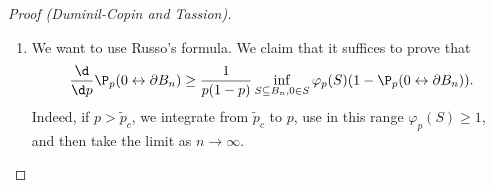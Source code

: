 \documentclass[a4paper]{article}
\begin{document}
\begin{proof}[Proof (Duminil-Copin and Tassion)]
\begin{enumerate}
      Now if we have an open path from $0$ to $\partial B_{kL}$, we let $x$ be the last element on the path that lies in $\mathcal{C}$. We can then replace the path up to $x$ by a path that lies entirely in $S$, by assumption. This is then a path that lies in $\mathcal{C}$ up to $x$, then takes an edge on $\partial S$, and then lies entirely outside of $\mathcal{C}^c$. Thus,
      \[
        \P_p(0 \leftrightarrow \partial B_{kL}) \leq \sum_{\substack{A \subseteq S\\0\in A}} \sum_{(x, y) \in \partial A} \P_p(0 \overset{A}{\leftrightarrow} x,\ (x, y)\text{ open},\ \mathcal{C} = A,\ y \overset{A^C}{\leftrightarrow} \partial B_{kL}).
      \]
      Now observe that the events $\{\mathcal{C} = A, 0 \overset{S}{\leftrightarrow} x\}$, $\{(x, y)\text{ is open}\}$ and $\{y \overset{A^c}{\leftrightarrow} \partial B_{kL}\}$ are independent. So we obtain
      \[
        \P_p(0 \leftrightarrow \partial B_{kL}) \leq \sum_{A \subseteq S, 0 \in A} \sum_{(x, y) \in \partial S} p\ \P_p(0\overset{S}{\leftrightarrow} x, \mathcal{C} = A) \ \P_p(y \overset{A^c}{\leftrightarrow} \partial B_{kL}).
      \]
      Since we know that $y \in B_L$, we can bound
      \[
        \P_p(y \overset{A^c}{\leftrightarrow}\partial B_{kL}) \leq \P_p(0 \leftrightarrow \partial B_{(k - 1)L}).
      \]
      So we have
      \begin{align*}
        \P_p(0 \leftrightarrow \partial B_{kL}) &\leq p\ \P_p(0 \leftrightarrow \partial B_{(k-1)L}) \sum_{A \subseteq S, 0 \in A} \sum_{(x, y) \in \partial S} \P_p(0 \overset{S}{\leftrightarrow} x, \mathcal{C} = A)\\
        &= \P_p(0 \leftrightarrow \partial B_{(k - 1)L})\ p\sum_{(x, y) \in \partial S} \P_p(0 \overset{S}{\leftrightarrow} x)\\
        &= \P_p(0 \leftrightarrow \partial B_{(k - 1)L}) \varphi_p(S).
      \end{align*}
      Iterating, we obtain the deseired result.
    \item We want to use Russo's formula. We claim that it suffices to prove that
      \[
        \frac{\d}{\d p} \P_p(0 \leftrightarrow \partial B_n) \geq \frac{1}{p(1 - p)} \inf_{S \subseteq B_n, 0 \in S} \varphi_p(S) (1 - \P_p(0 \leftrightarrow \partial B_n)).
      \]
      Indeed, if $p > \tilde{p}_c$, we integrate from $\tilde{p}_c$ to $p$, use in this range $\varphi_p(S) \geq 1$, and then take the limit as $n \to \infty$.


\end{enumerate}
\end{proof}
\end{document}
